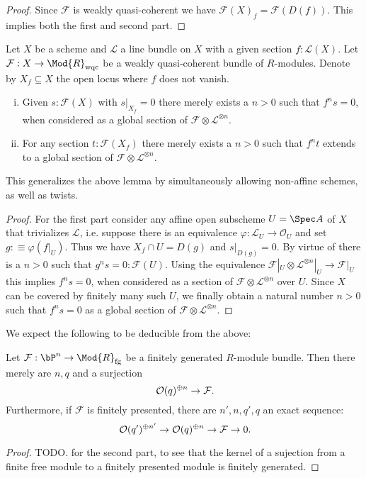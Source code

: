 \begin{proof}
  Since $\mathcal F$ is weakly quasi-coherent we have $\mathcal F (X)_f = \mathcal F (D(f))$.
  This implies both the first and second part.
\end{proof}


\begin{lemma}
  \label{affine-extension-of-sections}
  Let $X$ be a scheme and $\mathcal L$ a line bundle on $X$ with a given section $f:\mathcal L(X)$.
  Let $\mathcal F:X\to \Mod{R}_{\mathrm{wqc}}$ be a weakly quasi-coherent bundle of $R$-modules.
  Denote by $X_f \subseteq X$ the open locus where $f$ does not vanish.
  \begin{enumerate}[(i)]
    \item Given $s:\mathcal F(X)$ with $s|_{X_f} = 0$ there merely exists a $n>0$ such that $f^ns=0$,
      when considered as a global section of $\mathcal F \otimes \mathcal L^{\otimes n}$.
    \item For any section $t:\mathcal F (X_f)$ there merely exists a $n>0$
      such that $f^nt$ extends to a global section of $\mathcal F \otimes \mathcal L^{\otimes n}$.
  \end{enumerate}
\end{lemma}

This generalizes the above lemma by simultaneously allowing non-affine schemes, as well as twists.

\begin{proof}
  For the first part consider any affine open subscheme $U=\Spec A$ of $X$ that trivializes $\mathcal L$,
  i.e. suppose there is an equivalence  $\varphi:\mathcal L_U \to \mathcal O_U$ and set $g :\equiv \varphi(f|_U)$.
  Thus we have $X_f\cap U = D(g)$ and $s|_{D(g)}=0$.
  By virtue of  there is a $n>0$ such that $g^ns=0: \mathcal F(U)$.
  Using the equivalence $\mathcal F|_U\otimes\mathcal L^{\otimes n}|_U \to \mathcal F|_U$ this implies $f^ns=0$,
  when considered as a section of $\mathcal F\otimes\mathcal L^{\otimes n}$ over $U$.
  Since $X$ can be covered by finitely many such $U$, we finally obtain a natural number $n>0$ such that $f^ns=0$ as a global section of $\mathcal F\otimes\mathcal L^{\otimes n}$.

\end{proof}

We expect the following to be deducible from the above:

\begin{lemma}
  Let $\mathcal F:\bP^n \to \Mod{R}_{\mathrm{fg}}$ be a finitely generated $R$-module bundle.
  Then there merely are $n,q$ and a surjection
  \[ \mathcal O(q)^{\oplus n}\to \mathcal F\rlap{.}\]
  Furthermore, if $\mathcal F$ is finitely presented, there are $n',n,q',q$ an exact sequence:
  \[ \mathcal O(q')^{\oplus n'}\to \mathcal O(q)^{\oplus n}\to \mathcal F\to 0\rlap{.}\]
\end{lemma}

\begin{proof}
TODO.
\cite[Chapter IV, 1.0 Lemma]{lombardi-quitte} for the second part, to see that the kernel of a sujection from a finite free module to a finitely presented module is finitely generated.
\end{proof}
